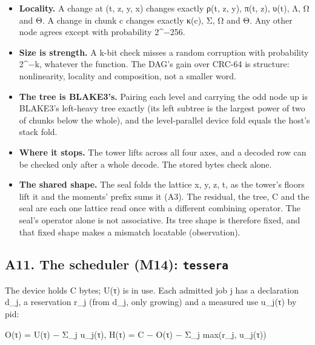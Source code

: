 \begin{itemize}
\item \textbf{Locality.} A change at (t, z, y, x) changes exactly ρ(t, z, y), π(t, z), υ(t), Λ, Ω and Θ. A change in chunk c changes exactly κ(c), Σ, Ω and Θ. Any other node agrees except with probability 2\textasciicircum{}−256.
\item \textbf{Size is strength.} A k-bit check misses a random corruption with probability 2\textasciicircum{}−k, whatever the function. The DAG's gain over CRC-64 is structure: nonlinearity, locality and composition, not a smaller word.
\item \textbf{The tree is BLAKE3's.} Pairing each level and carrying the odd node up is BLAKE3's left-heavy tree exactly (its left subtree is the largest power of two of chunks below the whole), and the level-parallel device fold equals the host's stack fold.
\item \textbf{Where it stops.} The tower lifts across all four axes, and a decoded row can be checked only after a whole decode. The stored bytes check alone.
\item \textbf{The shared shape.} The seal folds the lattice x, y, z, t, as the tower's floors lift it and the moments' prefix sums it (A3). The residual, the tree, C and the seal are each one lattice read once with a different combining operator. The seal's operator alone is not associative. Its tree shape is therefore fixed, and that fixed shape makes a mismatch locatable (observation).
\end{itemize}

\subsection{\texorpdfstring{A11. The scheduler (M14): \texttt{tessera}}{A11. The scheduler (M14): tessera}}

The device holds C bytes; U(τ) is in use. Each admitted job j has a declaration d\_\allowbreak{}j, a reservation r\_\allowbreak{}j (from d\_\allowbreak{}j, only growing) and a measured use u\_\allowbreak{}j(τ) by pid:

O(τ) = U(τ) − Σ\_\allowbreak{}j u\_\allowbreak{}j(τ),  H(τ) = C − O(τ) − Σ\_\allowbreak{}j max(r\_\allowbreak{}j, u\_\allowbreak{}j(τ))

